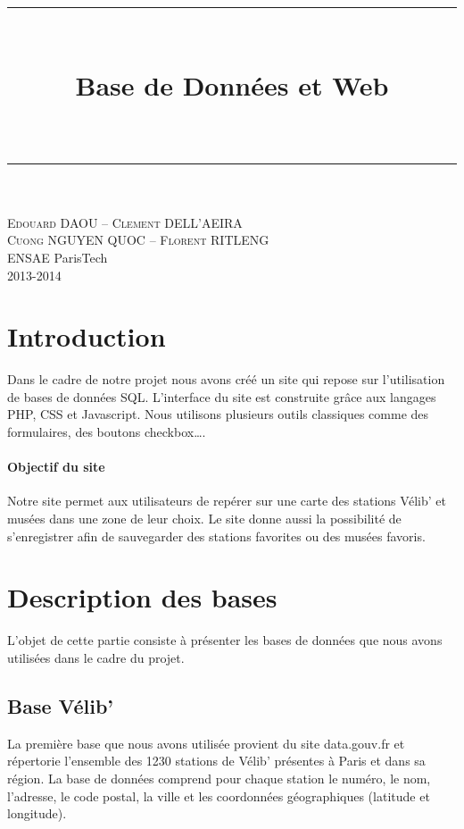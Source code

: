 \documentclass[a4paper]{article}
\title{\vspace{-4mm}\rule{13cm}{0.2pt}\\[0.4cm]
\fontsize{18pt}{15pt}\selectfont\textbf{Base de Données et Web}\\[0.1cm]
\fontsize{11pt}{10pt}\selectfont{Géolocalisation de stations de Vélib' et de musées à Paris}\\[0.4cm]
\rule{13cm}{1.4pt}} %
\date{}
\begin{document}
   \begin{flushright}
   \textsc{Edouard DAOU -- Clement DELL'AEIRA \\
     Cuong NGUYEN QUOC -- Florent RITLENG}\\
   ENSAE ParisTech \\
   2013-2014\\
   \vspace{-5mm}
   \end{flushright}
   \begingroup
   \let\newpage\relax%
\maketitle
\endgroup



\section{Introduction}
Dans le cadre de notre projet nous avons créé un site qui repose sur l'utilisation de bases de données SQL. L'interface du site est construite grâce aux langages PHP, CSS et Javascript. Nous utilisons plusieurs outils classiques comme des formulaires, des boutons checkbox\dots. 
\paragraph{Objectif du site}Notre site permet aux utilisateurs de repérer sur une carte des stations Vélib' et musées dans une zone de leur choix. Le site donne aussi la possibilité de s'enregistrer afin de sauvegarder des stations favorites ou des musées favoris.    
 
\section{Description des bases}

L'objet de cette partie consiste à présenter les bases de données que nous avons utilisées dans le cadre du projet. 

\subsection{Base Vélib'}

La première base que nous avons utilisée provient du site data.gouv.fr et répertorie l'ensemble des 1230 stations de Vélib' présentes à Paris et dans sa région. La base de données comprend pour chaque station le numéro, le nom, l'adresse, le code postal, la ville et les coordonnées géographiques (latitude et longitude). 
\end{document}
